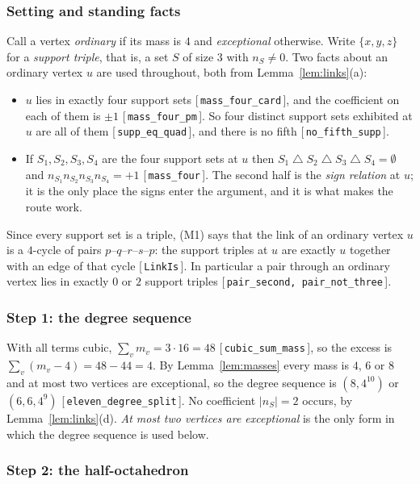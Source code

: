 \documentclass[11pt,reqno]{amsart}
\newcommand{\leanref}[1]{\textup{[\,\texttt{#1}\,]}}
\theoremstyle{plain}
\theoremstyle{definition}
\numberwithin{theorem}{section}
\newcommand{\sd}{\mathbin{\triangle}}
\begin{document}
\subsubsection*{Setting and standing facts}
Call a vertex \emph{ordinary} if its mass is $4$ and \emph{exceptional} otherwise. Write
$\{x,y,z\}$ for a \emph{support triple}, that is, a set $S$ of size $3$ with $n_S \ne 0$. Two
facts about an ordinary vertex $u$ are used throughout, both from Lemma~\ref{lem:links}(a):
\begin{itemize}[leftmargin=1.4em]
  \item[(M1)] $u$ lies in exactly four support sets \leanref{mass\_four\_card}, and the
  coefficient on each of them is $\pm1$ \leanref{mass\_four\_pm}. So four distinct support sets
  exhibited at $u$ are all of them \leanref{supp\_eq\_quad}, and there is no fifth
  \leanref{no\_fifth\_supp}.
  \item[(M2)] If $S_1, S_2, S_3, S_4$ are the four support sets at $u$ then
  $S_1 \sd S_2 \sd S_3 \sd S_4 = \emptyset$ and $n_{S_1} n_{S_2} n_{S_3} n_{S_4} = +1$
  \leanref{mass\_four}. The second half is the \emph{sign relation} at $u$; it is the only place
  the signs enter the argument, and it is what makes the route work.
\end{itemize}
Since every support set is a triple, (M1) says that the link of an ordinary vertex $u$ is a
$4$-cycle of pairs $p$--$q$--$r$--$s$--$p$: the support triples at $u$ are exactly $u$ together
with an edge of that cycle \leanref{LinkIs}. In particular a pair through an ordinary vertex
lies in exactly $0$ or $2$ support triples \leanref{pair\_second, pair\_not\_three}.

\subsubsection*{Step 1: the degree sequence}
With all terms cubic, $\sum_v m_v = 3 \cdot 16 = 48$ \leanref{cubic\_sum\_mass}, so the excess
is $\sum_v (m_v - 4) = 48 - 44 = 4$. By Lemma~\ref{lem:masses} every mass is $4$, $6$ or $8$
and at most two vertices are exceptional, so the degree sequence is $(8, 4^{10})$ or
$(6,6,4^9)$ \leanref{eleven\_degree\_split}. No coefficient $|n_S| = 2$ occurs, by
Lemma~\ref{lem:links}(d). \emph{At most two vertices are exceptional} is the only form in which
the degree sequence is used below.

\subsubsection*{Step 2: the half-octahedron}
\end{document}

